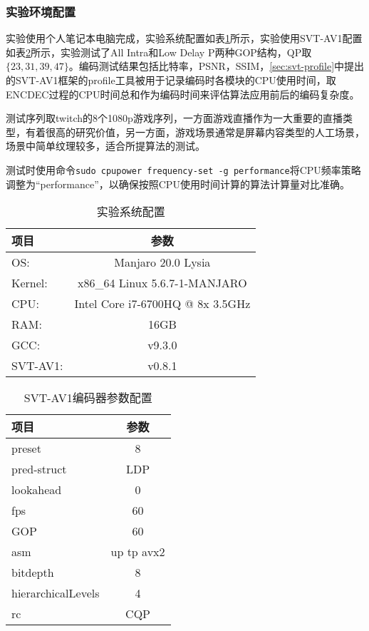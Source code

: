   \subsubsection{实验环境配置}
  实验使用个人笔记本电脑完成，实验系统配置如表\ref{tab:os}所示，实验使用SVT-AV1配置如表\ref{tab:svt}所示，实验测试了All Intra和Low Delay P两种GOP结构，QP取$\{23, 31, 39, 47\}$。编码测试结果包括比特率，PSNR，SSIM，\ref{sec:svt-profile}中提出的SVT-AV1框架的profile工具被用于记录编码时各模块的CPU使用时间，取ENCDEC过程的CPU时间总和作为编码时间来评估算法应用前后的编码复杂度。

  测试序列取twitch的8个1080p游戏序列，一方面游戏直播作为一大重要的直播类型，有着很高的研究价值，另一方面，游戏场景通常是屏幕内容类型的人工场景，场景中简单纹理较多，适合所提算法的测试。

  测试时使用命令\texttt{sudo cpupower frequency-set -g performance}将CPU频率策略调整为“performance”，以确保按照CPU使用时间计算的算法计算量对比准确。

  \begin{table}[!hpt]
    \renewcommand{\arraystretch}{0.9}
    \caption{实验系统配置}
    \label{tab:os}
    \centering
    \begin{tabular}{lc} \toprule
      项目& 参数  \\ \midrule
      OS:     &Manjaro 20.0 Lysia\\
      Kernel: & x86\_64 Linux 5.6.7-1-MANJARO\\
      CPU:    &Intel Core i7-6700HQ @ 8x 3.5GHz\\
      RAM:    &16GB\\
      GCC:    &v9.3.0\\
      SVT-AV1: & v0.8.1\\ \bottomrule
    \end{tabular}
  \end{table}

  \begin{table}[!hpt]
    \renewcommand{\arraystretch}{0.9}
    \caption{SVT-AV1编码器参数配置}
    \label{tab:svt}
    \centering
    \begin{tabular}{lc} \toprule
      项目& 参数  \\ \midrule
      preset     &8\\
      pred-struct& LDP\\
      lookahead    &0\\
      fps    &60\\
      GOP    &60\\
      asm    & up tp avx2\\
      bitdepth & 8\\
      hierarchicalLevels  & 4 \\
      rc & CQP\\ \bottomrule
    \end{tabular}
  \end{table}

